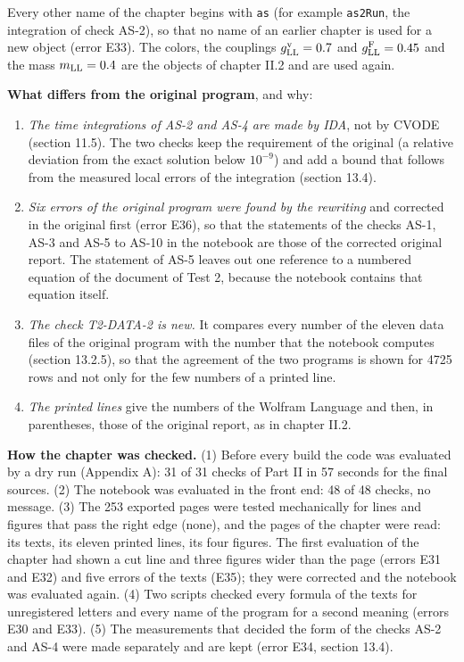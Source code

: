 \documentclass[
  10pt,
]{article}
\providecommand{\tightlist}{%
  \setlength{\itemsep}{0pt}\setlength{\parskip}{0pt}}
\begin{document}
Every other name of the chapter begins with \texttt{as} (for example
\texttt{as2Run}, the integration of check AS-2), so that no name of an
earlier chapter is used for a new object (error E33). The colors, the
couplings \(g^{\rm v}_{\rm LL}=0.7\) and \(g^{\rm F}_{\rm LL}=0.45\) and
the mass \(m_{\rm LL}=0.4\) are the objects of chapter II.2 and are used
again.

\textbf{What differs from the original program}, and why:

\begin{enumerate}
\def\labelenumi{\arabic{enumi}.}
\tightlist
\item
  \emph{The time integrations of AS-2 and AS-4 are made by IDA}, not by
  CVODE (section 11.5). The two checks keep the requirement of the
  original (a relative deviation from the exact solution below
  \(10^{-9}\)) and add a bound that follows from the measured local
  errors of the integration (section 13.4).
\item
  \emph{Six errors of the original program were found by the rewriting}
  and corrected in the original first (error E36), so that the
  statements of the checks AS-1, AS-3 and AS-5 to AS-10 in the notebook
  are those of the corrected original report. The statement of AS-5
  leaves out one reference to a numbered equation of the document of
  Test 2, because the notebook contains that equation itself.
\item
  \emph{The check T2-DATA-2 is new.} It compares every number of the
  eleven data files of the original program with the number that the
  notebook computes (section 13.2.5), so that the agreement of the two
  programs is shown for 4725 rows and not only for the few numbers of a
  printed line.
\item
  \emph{The printed lines} give the numbers of the Wolfram Language and
  then, in parentheses, those of the original report, as in chapter
  II.2.
\end{enumerate}

\textbf{How the chapter was checked.} (1) Before every build the code
was evaluated by a dry run (Appendix A): 31 of 31 checks of Part II in
57 seconds for the final sources. (2) The notebook was evaluated in the
front end: 48 of 48 checks, no message. (3) The 253 exported pages were
tested mechanically for lines and figures that pass the right edge
(none), and the pages of the chapter were read: its texts, its eleven
printed lines, its four figures. The first evaluation of the chapter had
shown a cut line and three figures wider than the page (errors E31 and
E32) and five errors of the texts (E35); they were corrected and the
notebook was evaluated again. (4) Two scripts checked every formula of
the texts for unregistered letters and every name of the program for a
second meaning (errors E30 and E33). (5) The measurements that decided
the form of the checks AS-2 and AS-4 were made separately and are kept
(error E34, section 13.4).
\end{document}
